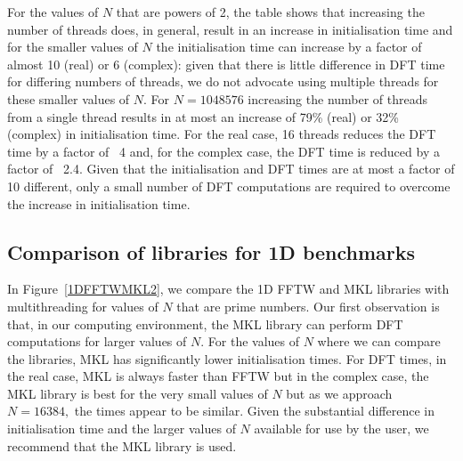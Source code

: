 \documentclass[a4paper]{article}
\begin{document}
For the values of $N$ that are powers of 2, the table shows that
increasing the number of threads does, in general, result in an
increase in initialisation time and for the smaller values of $N$ the
initialisation time can increase by a factor of almost 10 (real) or 6
(complex): given that there is little difference in DFT time for
differing numbers of threads, we do not advocate using multiple
threads for these smaller values of $N.$ For $N=1048576$ increasing
the number of threads from a single thread results in at most an
increase of 79\% (real) or 32\% (complex) in initialisation time. For
the real case, 16 threads reduces the DFT time by a factor of ~4 and,
for the complex case, the DFT time is reduced by a factor of
~2.4. Given that the initialisation and DFT times are at most a factor
of 10 different, only a small number of DFT computations are required
to overcome the increase in initialisation time.








\subsection{Comparison of libraries for 1D benchmarks}\label{Sec:1DComp}

In Figure~\ref{1DFFTWMKL2}, we compare the 1D FFTW and MKL libraries
with multithreading for values of $N$ that are prime numbers. Our
first observation is that, in our computing environment, the MKL
library can perform DFT computations for larger values of $N.$ For the
values of $N$ where we can compare the libraries, MKL has
significantly lower initialisation times. For DFT times, in the real
case, MKL is always faster than FFTW but in the complex case, the MKL
library is best for the very small values of $N$ but as we approach
$N=16384,$ the times appear to be similar. Given the substantial
difference in initialisation time and the larger values of $N$
available for use by the user, we recommend that the MKL library is
used.
\end{document}
